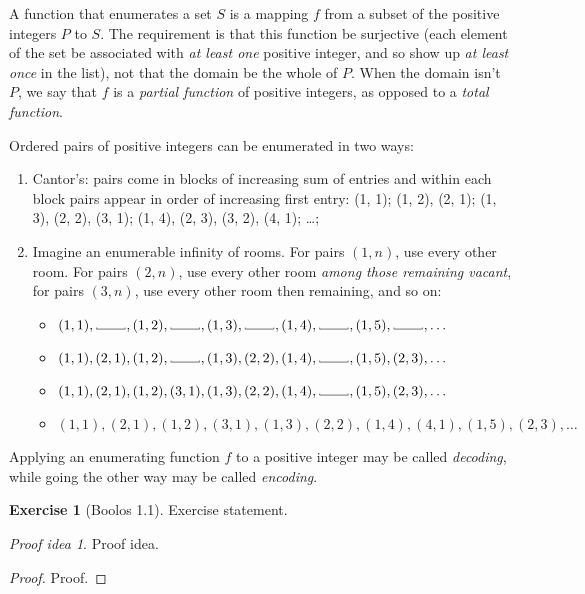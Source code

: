 \documentclass{article}
\theoremstyle{definition}
\newtheorem{exercise}{Exercise}
\theoremstyle{remark}
\newtheorem*{proofidea}{Proof idea}
\newcommand\vartextvisiblespace[1][.5em]{%
  \makebox[#1]{%
    \kern.07em
    \vrule height.3ex
    \hrulefill
    \vrule height.3ex
    \kern.07em
  }%
}
\begin{document}
A function that enumerates a set $S$ is a mapping $f$ from a subset of the positive integers $P$ to $S$.
The requirement is that this function be surjective (each element of the set be associated with \emph{at least one} positive integer, and so show up \emph{at least once} in the list), not that the domain be the whole of $P$.
When the domain isn't $P$, we say that $f$ is a \emph{partial function} of positive integers, as opposed to a \emph{total function}.

Ordered pairs of positive integers can be enumerated in two ways:
\begin{enumerate}
  \item Cantor's: pairs come in blocks of increasing sum of entries and within each block pairs appear in order of increasing first entry: (1, 1); (1, 2), (2, 1); (1, 3), (2, 2), (3, 1); (1, 4), (2, 3), (3, 2), (4, 1); \ldots;
  \item Imagine an enumerable infinity of rooms.
  For pairs $(1, n)$, use every other room.
  For pairs $(2, n)$, use every other room \emph{among those remaining vacant}, for pairs $(3, n)$, use every other room then remaining, and so on:
  \begin{itemize}
    \newcommand\room{\vartextvisiblespace[\widthof{$(1,1)$}]}
    \item $(1,1), \room, (1,2), \room, (1,3), \room, (1,4), \room, (1,5), \room, \ldots$
    \item $(1,1), (2,1), (1,2), \room, (1,3), (2,2), (1,4), \room, (1,5), (2,3), \ldots$
    \item $(1,1), (2,1), (1,2), (3,1), (1,3), (2,2), (1,4), \room, (1,5), (2,3), \ldots$
    \item $(1,1), (2,1), (1,2), (3,1), (1,3), (2,2), (1,4), (4,1), (1,5), (2,3), \ldots$
  \end{itemize}
\end{enumerate}

Applying an enumerating function $f$ to a positive integer may be called \emph{decoding}, while going the other way may be called \emph{encoding}.



\begin{exercise}[Boolos 1.1]
  Exercise statement.
\end{exercise}

\begin{proofidea}
  Proof idea.
\end{proofidea}

\begin{proof}
  Proof.
\end{proof}
\end{document}
